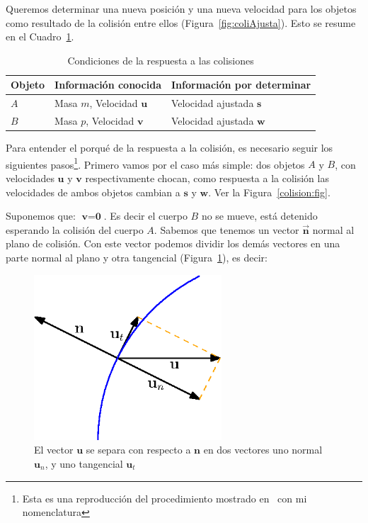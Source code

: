 Queremos determinar una nueva posición y una nueva velocidad para los objetos como resultado de la colisión entre ellos (Figura~\ref{fig:coliAjusta}).
Esto se resume en el Cuadro~\ref{condiciones:Colision}.

\begin{table}
\begin{center}
\begin{tabular} {@{}lll@{}}
\toprule
Objeto & Información conocida & Información por determinar \\
\midrule
$A$ & Masa $m$, Velocidad $\textbf{u}$ & Velocidad ajustada $\textbf{s}$ \\
$B$ & Masa $p$, Velocidad $\textbf{v}$ & Velocidad ajustada $\textbf{w}$ \\
\bottomrule
\end{tabular}
\end{center}
\caption{Condiciones de la respuesta a las colisiones}
\label{condiciones:Colision}
\end{table}

Para entender el porqué de la respuesta a la colisión, es necesario seguir los siguientes pasos\footnote{Esta es una reproducción del procedimiento mostrado en~\cite{FisicaMatematicasVideojuegos} con mi nomenclatura}.
Primero vamos por el caso más simple: dos objetos $A$ y $B$, con velocidades $\textbf{u}$ y $\textbf{v}$ respectivamente chocan, como respuesta a la colisión las velocidades de ambos objetos cambian a $\textbf{s}$ y $\textbf{w}$.
Ver la Figura~\ref{colision:fig}.

Suponemos que: $\textbf{v} = \textbf{0}$. Es decir el cuerpo $B$ no se mueve, está detenido esperando la colisión del cuerpo $A$. Sabemos que tenemos un vector $\vec{\textbf{n}}$ normal al plano de colisión.
Con este vector podemos dividir los demás vectores en una parte normal al plano y otra tangencial  (Figura~\ref{comVec:fig}), es decir:

\begin{figure}
 \centering
 \includegraphics[width=7cm]{Img/02/vector_componente}
 \caption[Separar componente tangencial y normal de un vector]{ 
 El vector $\textbf{u}$ se separa con respecto a $\textbf{n}$ en dos vectores uno normal $\textbf{u}_n$, y uno tangencial $\textbf{u}_t$ 
 } \label{comVec:fig}
\end{figure}

